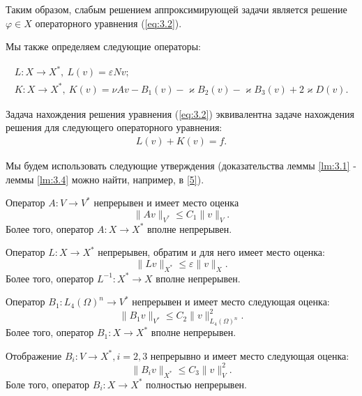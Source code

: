 Таким образом, слабым решением аппроксимирующей задачи является решение $\varphi \in X$ операторного уравнения (\ref{eq:3.2}).

Мы также определяем следующие операторы:

\begin{equation*}
    \begin{gathered}
        L: X \rightarrow X^*, \ L(v) = \varepsilon N v; \\
        K: X \rightarrow X^*, \ K(v) = \nu A v - B_1(v) - \varkappa B_2(v) - \varkappa B_3(v) + 2 \varkappa D(v).
    \end{gathered}
\end{equation*}

Задача нахождения решения уравнения (\ref{eq:3.2}) эквивалентна задаче нахождения решения для следующего операторного уравнения:
\begin{equation}\label{eq:3.3}
    \begin{gathered}
        L(v)+K(v)=f.
    \end{gathered}
\end{equation}

Мы будем использовать следующие утверждения (доказательства леммы \ref{lm:3.1} - леммы \ref{lm:3.4} можно найти, например, в \hyperlink{L5}{[5]}).
\begin{lemma}\label{lm:3.1}
    Оператор $A:V\rightarrow V^*$ непрерывен и имеет место оценка 
    $$\parallel Av\parallel_{V^*}\leqslant C_1\parallel v\parallel_V.$$
    Более того, оператор $A:X\rightarrow X^*$ вполне непрерывен.
\end{lemma}

\begin{lemma}\label{lm:3.2}
    Оператор $L:X\rightarrow X^*$ непрерывен, обратим и для него имеет место оценка:
    $$\parallel Lv\parallel_{X^*}\leqslant\varepsilon\parallel v\parallel_X.$$
    Более того, оператор $L^{-1}:X^*\rightarrow X$ вполне непрерывен.
\end{lemma}

\begin{lemma}\label{lm:3.3}
    Оператор $B_1:L_4(\Omega)^n \rightarrow V^*$ непрерывен и имеет место следующая оценка:
    $$\parallel B_1v\parallel_{V^*}\leqslant C_2\parallel v\parallel^2_{L_4(\Omega)^n}.$$
    Более того, оператор $B_1:X\rightarrow X^*$ вполне непрерывен.
\end{lemma}

\begin{lemma}\label{lm:3.4}
    Отображение $B_i:V\rightarrow X^*, i=2,3$ непрерывно и имеет место следующая оценка:
    $$\parallel B_iv\parallel_{X^*}\leqslant C_3\parallel v\parallel^2_V.$$
    Боле того, оператор $B_i:X\rightarrow X^*$ полностью непрерывен.
\end{lemma}

